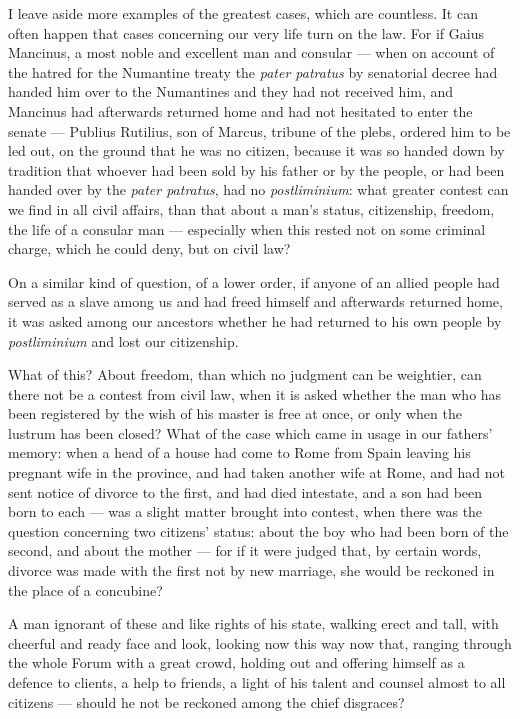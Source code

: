 I leave aside more examples of the greatest cases, which are countless. It can often happen that cases concerning our very life turn on the law. For if Gaius Mancinus, a most noble and excellent man and consular — when on account of the hatred for the Numantine treaty the \textit{pater patratus} by senatorial decree had handed him over to the Numantines and they had not received him, and Mancinus had afterwards returned home and had not hesitated to enter the senate — Publius Rutilius, son of Marcus, tribune of the plebs, ordered him to be led out, on the ground that he was no citizen, because it was so handed down by tradition that whoever had been sold by his father or by the people, or had been handed over by the \textit{pater patratus}, had no \textit{postliminium}: what greater contest can we find in all civil affairs, than that about a man's status, citizenship, freedom, the life of a consular man — especially when this rested not on some criminal charge, which he could deny, but on civil law?

 On a similar kind of question, of a lower order, if anyone of an allied people had served as a slave among us and had freed himself and afterwards returned home, it was asked among our ancestors whether he had returned to his own people by \textit{postliminium} and lost our citizenship.

 What of this? About freedom, than which no judgment can be weightier, can there not be a contest from civil law, when it is asked whether the man who has been registered by the wish of his master is free at once, or only when the lustrum has been closed? What of the case which came in usage in our fathers' memory: when a head of a house had come to Rome from Spain leaving his pregnant wife in the province, and had taken another wife at Rome, and had not sent notice of divorce to the first, and had died intestate, and a son had been born to each — was a slight matter brought into contest, when there was the question concerning two citizens' status: about the boy who had been born of the second, and about the mother — for if it were judged that, by certain words, divorce was made with the first not by new marriage, she would be reckoned in the place of a concubine?

 A man ignorant of these and like rights of his state, walking erect and tall, with cheerful and ready face and look, looking now this way now that, ranging through the whole Forum with a great crowd, holding out and offering himself as a defence to clients, a help to friends, a light of his talent and counsel almost to all citizens — should he not be reckoned among the chief disgraces?

